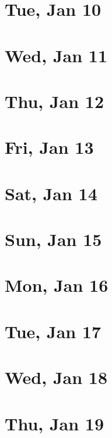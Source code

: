 	\section{Tue, Jan 10}
		
		
	\section{Wed, Jan 11}
		
		
	\section{Thu, Jan 12}
		
		
	\section{Fri, Jan 13}
		
		
	\section{Sat, Jan 14}
		
		
	\section{Sun, Jan 15}
		
		
	\section{Mon, Jan 16}
		
		
	\section{Tue, Jan 17}
		
		
	\section{Wed, Jan 18}
		
		
	\section{Thu, Jan 19}
		
		
